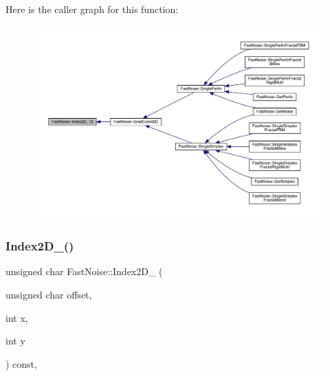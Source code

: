 Here is the caller graph for this function\+:
\nopagebreak
\begin{figure}[H]
\begin{center}
\leavevmode
\includegraphics[width=350pt]{d1/dd8/class_fast_noise_aa4cae648a6a3817d77dcd7439f711827_icgraph}
\end{center}
\end{figure}
\mbox{\label{class_fast_noise_aec59eb9f9bcdb06e6a7dbe5a3fdf7145}} 
\subsubsection{\texorpdfstring{Index2\+D\+\_()}{Index2D\_256()}}
{\footnotesize\ttfamily unsigned char Fast\+Noise\+::\+Index2\+D\+\_ (\begin{DoxyParamCaption}\item[{unsigned char}]{offset,  }\item[{int}]{x,  }\item[{int}]{y }\end{DoxyParamCaption}) const\hspace{0.3cm}{\ttfamily [inline]}, {\ttfamily [private]}}

